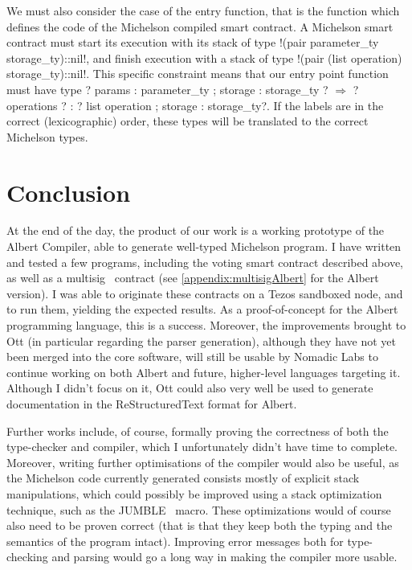 \documentclass{report}
\begin{document}
We must also consider the case of the entry function, that is the function which defines the code of the Michelson compiled smart contract. A Michelson smart contract must start its execution with its stack of type !(pair parameter_ty storage_ty)::nil!, and finish execution with a stack of type !(pair (list operation) storage_ty)::nil!. This specific constraint means that our entry point function must have type ?{ params : parameter_ty ; storage : storage_ty }? $\Rightarrow$ ?{ operations ? : ? list operation ; storage : storage_ty}?. If the labels are in the correct (lexicographic) order, these types will be translated to the correct Michelson types.

\chapter*{Conclusion}

At the end of the day, the product of our work is a working prototype of the Albert Compiler, able to generate well-typed Michelson program. I have written and tested a few programs, including the voting smart contract described above, as well as a multisig~\cite{multisigArthur} contract (see \ref{appendix:multisigAlbert} for the Albert version). I was able to originate these contracts on a Tezos sandboxed node, and to run them, yielding the expected results. As a proof-of-concept for the Albert programming language, this is a success. Moreover, the improvements brought to Ott (in particular regarding the parser generation), although they have not yet been merged into the core software, will still be usable by Nomadic Labs to continue working on both Albert and future, higher-level languages targeting it. Although I didn't focus on it, Ott could also very well be used to generate documentation in the ReStructuredText format for Albert.

Further works include, of course, formally proving the correctness of both the type-checker and compiler, which I unfortunately didn't have time to complete. Moreover, writing further optimisations of the compiler would also be useful, as the Michelson code currently generated consists mostly of explicit stack manipulations, which could possibly be improved using a stack optimization technique, such as the JUMBLE~\cite{jumble} macro. These optimizations would of course also need to be proven correct (that is that they keep both the typing and the semantics of the program intact). Improving error messages both for type-checking and parsing would go a long way in making the compiler more usable.\\
\end{document}
